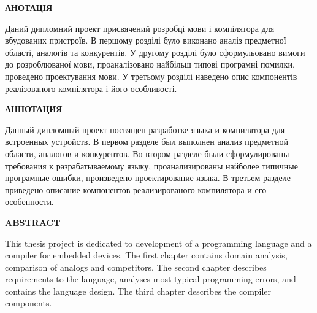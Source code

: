 \documentclass[main.tex]{subfiles}
\begin{document}
\begin{specialpage}
  \begin{spacing}{1.5}
  \vfill

  \textbf{АНОТАЦІЯ}\\
  \vspace{5mm}
  \begin{minipage}{\textwidth}
    Даний дипломний проект присвячений розробці мови і компілятора для вбудованих пристроїв.
    В першому розділі було виконано аналіз предметної області, аналогів та конкурентів.
    У другому розділі було сформульовано вимоги до розроблюваної мови, проаналізовано найбільш типові програмні помилки, проведено проектування мови.
    У третьому розділі наведено опис компонентів реалізованого компілятора і його особливості.
  \end{minipage}

  \vfill

  \textbf{АННОТАЦИЯ}\\
  \vspace{5mm}
  \begin{minipage}{\textwidth}
    Данный дипломный проект посвящен разработке языка и компилятора для встроенных устройств.
    В первом разделе был выполнен анализ предметной области, аналогов и конкурентов.
    Во втором разделе были сформулированы требования к разрабатываемому языку, проанализированы найболее типичные програмные ошибки, произведено проектирование языка.
    В третьем разделе приведено описание компонентов реализированого компилятора и его особенности.
  \end{minipage}

  \vfill

  \textbf{ABSTRACT}\\
  \vspace{5mm}
  \begin{minipage}{\textwidth}
    This thesis project is dedicated to development of a programming language and a compiler for embedded devices.
    The first chapter contains domain analysis, comparison of analogs and competitors.
    The second chapter describes requirements to the language, analyses most typical programming errors, and contains the language design.
    The third chapter describes the compiler components.
  \end{minipage}
  \vfill

  \end{spacing}
\end{specialpage}
\end{document}
